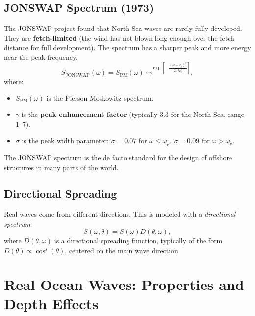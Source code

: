 \documentclass[11pt,letterpaper]{article}
\begin{document}
    \subsection{JONSWAP Spectrum (1973)}
    The JONSWAP project found that North Sea waves are rarely fully developed. They are \textbf{fetch-limited} (the wind has not blown long enough over the fetch distance for full development). The spectrum has a sharper peak and more energy near the peak frequency.
    \begin{equation}
        S_{\text{JONSWAP}}(\omega) = S_{\text{PM}}(\omega) \cdot \gamma^{\exp\left[-\frac{(\omega - \omega_p)^2}{2\sigma^2\omega_p^2}\right]},
    \end{equation}
    where:
    \begin{itemize}
        \item $S_{\text{PM}}(\omega)$ is the Pierson-Moskowitz spectrum.
        \item $\gamma$ is the \textbf{peak enhancement factor} (typically 3.3 for the North Sea, range 1–7).
        \item $\sigma$ is the peak width parameter: $\sigma = 0.07$ for $\omega \leq \omega_p$, $\sigma = 0.09$ for $\omega > \omega_p$.
    \end{itemize}
    The JONSWAP spectrum is the de facto standard for the design of offshore structures in many parts of the world.

    \subsection{Directional Spreading}
    Real waves come from different directions. This is modeled with a \emph{directional spectrum}:
    \begin{equation}
        S(\omega, \theta) = S(\omega) D(\theta, \omega),
    \end{equation}
    where $D(\theta, \omega)$ is a directional spreading function, typically of the form $D(\theta) \propto \cos^s(\theta)$, centered on the main wave direction.

    \section{Real Ocean Waves: Properties and Depth Effects}
\end{document}
